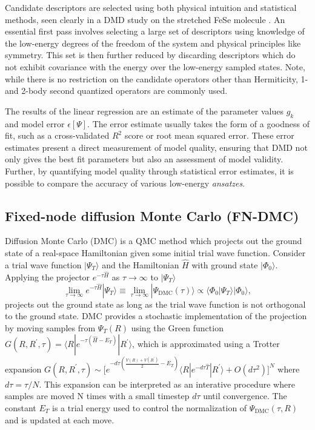 \documentclass[12pt]{article}
\begin{document}
Candidate descriptors are selected using both physical intuition and statistical
methods, seen clearly in a DMD study on the stretched FeSe molecule \cite{Zheng2017}.
An essential first pass involves selecting a large set of descriptors using knowledge of the low-energy degrees of the freedom of the system and physical principles like symmetry.
This set is then further reduced by discarding descriptors which do not exhibit covariance with the energy over the low-energy sampled states.
Note, while there is no restriction on the candidate operators other than Hermiticity, 1- and 2-body second quantized operators are commonly used.

The results of the linear regression are an estimate of the parameter values $g_k$ and model error $\epsilon[\Psi]$.
The error estimate usually takes the form of a goodness of fit, such as a cross-validated $R^2$ score or root mean squared error.
These error estimates present a direct measurement of model quality, ensuring that DMD not only gives the best fit parameters but also an assessment of model validity.
Further, by quantifying model quality through statistical error estimates, it is possible to compare the accuracy of various low-energy \textit{ansatzes}.

\subsection{Fixed-node diffusion Monte Carlo (FN-DMC)}
Diffusion Monte Carlo (DMC) is a QMC method which projects out the ground state of a real-space Hamiltonian given some initial trial wave function.
Consider a trial wave function $|\Psi_T\rangle$ and the Hamiltonian $\hat{H}$ with ground state $|\Phi_0\rangle$. 
Applying the projector $e^{-\tau \hat{H}}$ as $\tau \rightarrow \infty$ to $|\Psi_T \rangle$
\begin{equation}
\lim_{\tau \rightarrow \infty} e^{-\tau \hat{H}} |\Psi_T\rangle 
\equiv \lim_{\tau \rightarrow \infty} |\Psi_\text{DMC}(\tau)\rangle \propto \langle \Phi_0|\Psi_T\rangle |\Phi_0\rangle,
\end{equation}
projects out the ground state as long as the trial wave function is not orthogonal to the ground state. 
DMC provides a stochastic implementation of the projection by moving samples from $\Psi_T(R)$ using the Green function $G(R, R^\prime, \tau) = \langle R | e^{-\tau(\hat{H} - E_T)} | R^\prime \rangle$, which is approximated using a Trotter expansion $G(R, R^\prime, \tau) \sim \Big[e^{-d\tau(\frac{V(R) + V(R^\prime)}{2} - E_T)} \langle R| e^{-d\tau\hat{T}}|R^\prime \rangle + O(d\tau^2) \Big]^N $ 
where $d\tau = \tau/N$.
This expansion can be interpreted as an interative procedure where samples are moved N times with a small timestep $d\tau$ until convergence.
The constant $E_T$ is a trial energy used to control the normalization of $\Psi_\text{DMC}(\tau, R)$ and is updated at each move.
\end{document}
